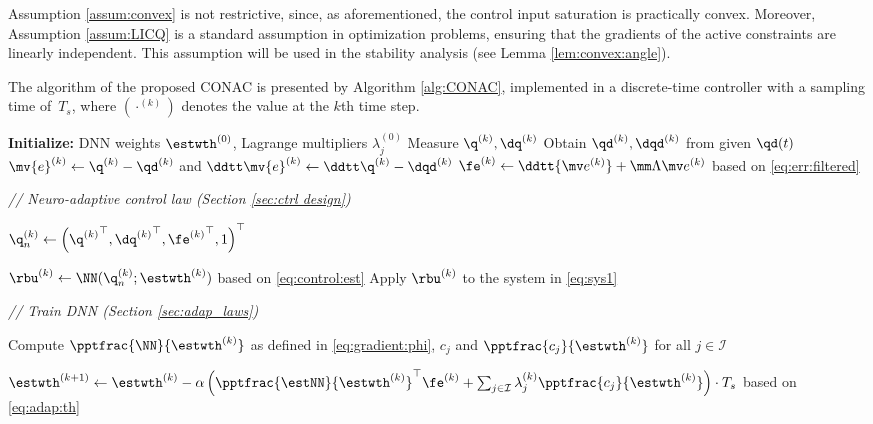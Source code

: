 \documentclass[letterpaper, journal]{IEEEtran}
\begin{document}
\begin{remark}
    Assumption \ref{assum:convex} is not restrictive, since, as aforementioned, the control input saturation is practically convex.
    Moreover, Assumption \ref{assum:LICQ} is a standard assumption in optimization problems, ensuring that the gradients of the active constraints are linearly independent.
    This assumption will be used in the stability analysis (see Lemma \ref{lem:convex:angle}).
\end{remark}

The algorithm of the proposed CONAC is presented by Algorithm \ref{alg:CONAC}, implemented in a discrete-time controller with a sampling time of~$T_s$, where $(\cdot^{(k)})$ denotes the value at the $k$th time step.

\begin{algorithm}[!t]
    \caption{Proposed CONAC}\label{alg:CONAC}
    \begin{algorithmic}[1]
        \STATE \textbf{Initialize:} DNN weights $\estwth^{(0)}$, Lagrange multipliers $\lambda_j^{(0)}$
            \STATE Measure $\q^{(k)},\dq^{(k)}$
            \STATE Obtain $\qd^{(k)},\dqd^{(k)}$ from given $\qd(t)$
            \STATE $\mv{e}^{(k)}\leftarrow\q^{(k)}-\qd^{(k)}$ and $\ddtt\mv{e}^{(k)}\leftarrow\ddtt\q^{(k)}-\dqd^{(k)}$
            \STATE $\fe^{(k)} \leftarrow \ddtt{\mv e^{(k)}}+\mm\Lambda \mv e^{(k)}$ based on \eqref{eq:err:filtered}

            \STATE \textit{// Neuro-adaptive control law (Section \ref{sec:ctrl design})}

                \STATE ${\q}_n^{(k)}\leftarrow
                    \left(
                        {\q^{(k)}}^\top,{\dq^{(k)}}^\top,{\fe^{(k)}}^\top,1
                    \right)^\top$
                
                \STATE $\rbu^{(k)}\leftarrow\NN({\q}_n^{(k)};\estwth^{(k)}) $ based on \eqref{eq:control:est}
                \STATE Apply $\rbu^{(k)}$ to the system in \eqref{eq:sys1}

            \STATE \textit{// Train DNN (Section \ref{sec:adap_laws})}

            \STATE Compute $\pptfrac{\NN}{\estwth^{(k)}}$ as defined in \eqref{eq:gradient:phi}, $c_j$ and $\pptfrac{c_j}{\estwth^{(k)}}$ for all $j\in\mathcal{I}$          
            
            \STATE $\estwth^{(k+1)}
                    \leftarrow
                    \estwth^{(k)}
                    -\alpha 
                    \left(
                        {\pptfrac{\estNN}
                        {\estwth^{(k)}}}^\top
                        \fe^{(k)}
                        +
                        \textstyle\sum_{j\in\mathcal{I}}
                        \lambda_j^{(k)} 
                        \pptfrac{c_j}{\estwth^{(k)}}
                    \right)\cdot T_s$ based on \eqref{eq:adap:th}


\end{algorithmic}
\end{algorithm}
\end{document}
